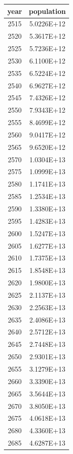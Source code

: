 \documentclass[a4paper]{article}
\begin{document}
	\begin{tabular}{|c|c|}
		\hline
		year & population \\
		\hline
		2515 & 5.0226E+12 \\
		\hline
		2520 & 5.3617E+12 \\
		\hline
		2525 & 5.7236E+12 \\
		\hline
		2530 & 6.1100E+12 \\
		\hline
		2535 & 6.5224E+12 \\
		\hline
		2540 & 6.9627E+12 \\
		\hline
		2545 & 7.4326E+12 \\
		\hline
		2550 & 7.9343E+12 \\
		\hline
		2555 & 8.4699E+12 \\
		\hline
		2560 & 9.0417E+12 \\
		\hline
		2565 & 9.6520E+12 \\
		\hline
		2570 & 1.0304E+13 \\
		\hline
		2575 & 1.0999E+13 \\
		\hline
		2580 & 1.1741E+13 \\
		\hline
		2585 & 1.2534E+13 \\
		\hline
		2590 & 1.3380E+13 \\
		\hline
		2595 & 1.4283E+13 \\
		\hline
		2600 & 1.5247E+13 \\
		\hline
		2605 & 1.6277E+13 \\
		\hline
		2610 & 1.7375E+13 \\
		\hline
		2615 & 1.8548E+13 \\
		\hline
		2620 & 1.9800E+13 \\
		\hline
		2625 & 2.1137E+13 \\
		\hline
		2630 & 2.2563E+13 \\
		\hline
		2635 & 2.4086E+13 \\
		\hline
		2640 & 2.5712E+13 \\
		\hline
		2645 & 2.7448E+13 \\
		\hline
		2650 & 2.9301E+13 \\
		\hline
		2655 & 3.1279E+13 \\
		\hline
		2660 & 3.3390E+13 \\
		\hline
		2665 & 3.5644E+13 \\
		\hline
		2670 & 3.8050E+13 \\
		\hline
		2675 & 4.0618E+13 \\
		\hline
		2680 & 4.3360E+13 \\
		\hline
		2685 & 4.6287E+13 \\

\end{tabular}
\end{document}
